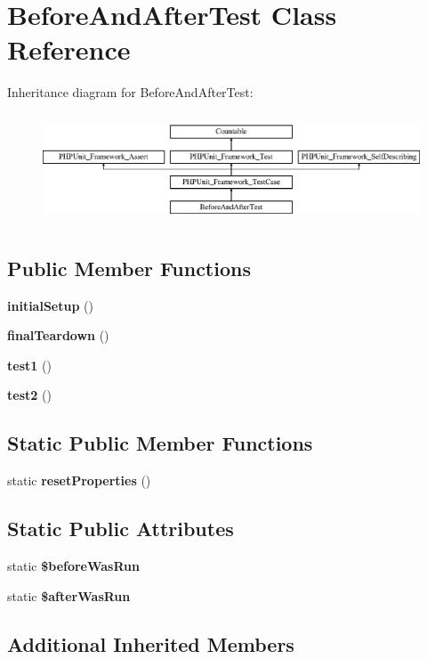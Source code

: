 \section{Before\+And\+After\+Test Class Reference}
\label{class_before_and_after_test}
Inheritance diagram for Before\+And\+After\+Test\+:\begin{figure}[H]
\begin{center}
\leavevmode
\includegraphics[height=3.303835cm]{class_before_and_after_test}
\end{center}
\end{figure}
\subsection*{Public Member Functions}
\begin{DoxyCompactItemize}
\item 
{\bf initial\+Setup} ()
\item 
{\bf final\+Teardown} ()
\item 
{\bf test1} ()
\item 
{\bf test2} ()
\end{DoxyCompactItemize}
\subsection*{Static Public Member Functions}
\begin{DoxyCompactItemize}
\item 
static {\bf reset\+Properties} ()
\end{DoxyCompactItemize}
\subsection*{Static Public Attributes}
\begin{DoxyCompactItemize}
\item 
static {\bf \$before\+Was\+Run}
\item 
static {\bf \$after\+Was\+Run}
\end{DoxyCompactItemize}
\subsection*{Additional Inherited Members}


